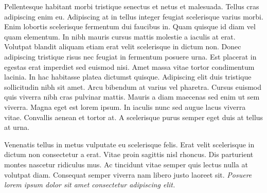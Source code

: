 \documentclass[12pt]{article}
\begin{document}
Pellentesque habitant morbi tristique senectus et netus et
malesuada. Tellus cras adipiscing enim eu. Adipiscing at in tellus
integer feugiat scelerisque varius morbi. Enim lobortis scelerisque
fermentum dui faucibus in. Quam quisque id diam vel quam elementum. In
nibh mauris cursus mattis molestie a iaculis at erat. Volutpat blandit
aliquam etiam erat velit scelerisque in dictum non. Donec adipiscing
tristique risus nec feugiat in fermentum posuere urna. Est placerat in
egestas erat imperdiet sed euismod nisi. Amet massa vitae tortor
condimentum lacinia. In hac habitasse platea dictumst
quisque. Adipiscing elit duis tristique sollicitudin nibh sit
amet. Arcu bibendum at varius vel pharetra. Cursus euismod quis
viverra nibh cras pulvinar mattis. Mauris a diam maecenas sed enim ut
sem viverra. Magna eget est lorem ipsum. In iaculis nunc sed augue
lacus viverra vitae. Convallis aenean et tortor at. A scelerisque
purus semper eget duis at tellus at urna.

Venenatis tellus in metus vulputate eu scelerisque felis. Erat velit
scelerisque in dictum non consectetur a erat. Vitae proin sagittis
nisl rhoncus. Dis parturient montes nascetur ridiculus mus. Ac
tincidunt vitae semper quis lectus nulla at volutpat diam. Consequat
semper viverra nam libero justo laoreet sit. \textit{Posuere lorem
  ipsum dolor sit amet consectetur adipiscing elit.}



\end{document}
